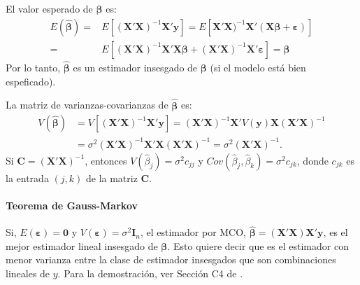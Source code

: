 \documentclass[
]{article}
\begin{document}
El valor esperado de \(\widehat{\boldsymbol \beta}\) es:
\begin{equation}
\begin{split}
E(\widehat{\boldsymbol \beta}) =& E\left[ (\boldsymbol X'\boldsymbol X)^{-1}\boldsymbol X'\boldsymbol y\right] = E\left[ \boldsymbol X'\boldsymbol X)^{-1}\boldsymbol X'(\boldsymbol X\boldsymbol \beta+ \boldsymbol \varepsilon) \right] \\
=& E\left[ (\boldsymbol X'\boldsymbol X)^{-1}\boldsymbol X'\boldsymbol X\boldsymbol \beta+ (\boldsymbol X'\boldsymbol X)^{-1}\boldsymbol X'\boldsymbol \varepsilon\right] = \boldsymbol \beta
\end{split}
\nonumber
\end{equation}
Por lo tanto, \(\widehat{\boldsymbol \beta}\) es un estimador insesgado de \(\boldsymbol \beta\) (si el modelo está bien espeficado).

La matriz de varianzas-covarianzas de \(\widehat{\boldsymbol \beta}\) es:
\begin{equation}
\begin{split}
V(\widehat{\boldsymbol \beta}) &= V\left[ (\boldsymbol X'\boldsymbol X)^{-1}\boldsymbol X'\boldsymbol y\right] = (\boldsymbol X'\boldsymbol X)^{-1}\boldsymbol X'V(\boldsymbol y)\boldsymbol X(\boldsymbol X'\boldsymbol X)^{-1}  \\
&= \sigma^{2}(\boldsymbol X'\boldsymbol X)^{-1}\boldsymbol X'\boldsymbol X(\boldsymbol X'\boldsymbol X)^{-1} = \sigma^{2}(\boldsymbol X'\boldsymbol X)^{-1}.
\end{split}
\nonumber
\end{equation}
Si \(\boldsymbol C=(\boldsymbol X'\boldsymbol X)^{-1}\), entonces \(V(\widehat{\beta}_{j}) = \sigma^{2}c_{jj}\) y \(Cov(\widehat{\beta}_{j},\widehat{\beta}_{k})=\sigma^{2}c_{jk}\), donde \(c_{jk}\) es la entrada \((j,k)\) de la matriz \(\boldsymbol C\).

\hypertarget{teorema-de-gauss-markov}{%
\paragraph*{Teorema de Gauss-Markov}\label{teorema-de-gauss-markov}}

Si, \(E(\boldsymbol \varepsilon) = \boldsymbol 0\) y \(V(\boldsymbol \varepsilon) = \sigma^{2}\boldsymbol I_{n}\), el estimador por MCO, \(\widehat{\boldsymbol \beta}= (\boldsymbol X'\boldsymbol X)\boldsymbol X'\boldsymbol y\), es el mejor estimador lineal insesgado de \(\boldsymbol \beta\). Esto quiere decir que es el estimador con menor varianza entre la clase de estimador insesgados que son combinaciones lineales de \(y\). Para la demostración, ver Sección C4 de \citet{montgomery_introduction_2012}.
\end{document}
